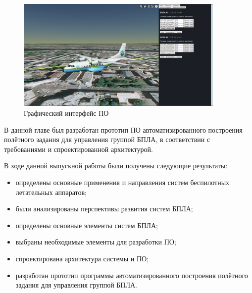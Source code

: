 \documentclass[specification,annotation]{itmo-student-thesis}
\begin{document}
\begin{figure}[!h]
  \caption{Графический интерфейс ПО}\label{pic:gui}
  \centering
  \includegraphics[width=0.9\textwidth]{gui}
\end{figure}

\chapterconclusion

В данной главе был разработан прототип ПО автоматизированного построения
полётного задания для управления группой БПЛА, в соответствии с требованиями и
спроектированной архитектурой.

\startconclusionpage

В ходе данной выпускной работы были получены следующие результаты:

\begin{itemize}
  \item определены основные применения и направления систем беспилотных
    летательных аппаратов;
  \item были анализированы перспективы развития систем БПЛА;
  \item определены основные элементы систем БПЛА;
  \item выбраны необходимые элементы для разработки ПО;
  \item спроектирована архитектура системы и ПО;
  \item разработан прототип программы автоматизированного построения полётного
    задания для управления группой БПЛА.
\end{itemize}

\startabbreviationspage
\end{document}
